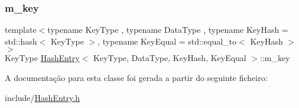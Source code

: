 \mbox{\label{classHashEntry_a244e0393cbbe8a50f96f280fdbbaf311}} 
\subsubsection{\texorpdfstring{m\+\_\+key}{m\_key}}
{\footnotesize\ttfamily template$<$typename Key\+Type , typename Data\+Type , typename Key\+Hash  = std\+::hash$<$ Key\+Type $>$, typename Key\+Equal  = std\+::equal\+\_\+to$<$ Key\+Hash $>$$>$ \\
Key\+Type \hyperlink{classHashEntry}{Hash\+Entry}$<$ Key\+Type, Data\+Type, Key\+Hash, Key\+Equal $>$\+::m\+\_\+key}



A documentação para esta classe foi gerada a partir do seguinte ficheiro\+:\begin{DoxyCompactItemize}
\item 
include/\hyperlink{HashEntry_8h}{Hash\+Entry.\+h}\end{DoxyCompactItemize}
